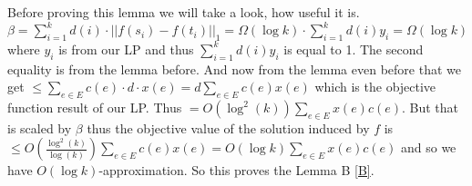 Before proving this lemma we will take a look, how useful it is. $\beta = \sum_{i = 1}^{k} d(i) \cdot ||f(s_{i}) - f(t_{i})||_{1} = \Omega(\log k) \cdot \sum_{i = 1}^{k} d(i) y_{i} = \Omega(\log k)$ where $y_{i}$ is from our LP and thus $\sum_{i = 1}^{k} d(i) y_{i}$ is equal to 1. The second equality is from the lemma before. And now from the lemma even before that we get $\leq \sum_{e \in E} c(e) \cdot d \cdot x(e) = d \sum_{e \in E} c(e) x(e)$ which is the objective function result of our LP. Thus $= O(\log^{2}(k)) \sum_{e \in E} x(e) c(e)$. But that is scaled by $\beta$ thus the objective value of the solution induced by $f$ is $\leq O \left(\frac{\log^{2}(k)}{\log(k)}\right) \sum_{e \in E} c(e) x(e) = O(\log k) \sum_{e \in E} x(e) c(e)$ and so we have $O(\log k)$-approximation. So this proves the Lemma B \ref{B}.

